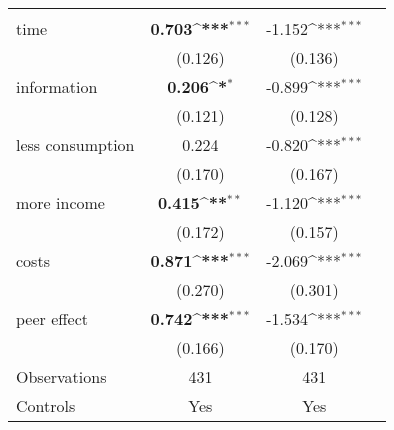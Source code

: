 \documentclass[pdflatex]{beamer}
\def\sym#1{\ifmmode^{#1}\else\(^{#1}\)\fi}
\begin{document}
\begin{frame}
\begin{table}[]
{\begin{tabular}{l*{3}{c}}
				\hline
				&                     &                     \\
				time                &       \textbf{0.703\sym{***}}&      -1.152\sym{***}\\
				&     (0.126)         &     (0.136)         \\
				[1em]
				information         &       \textbf{0.206\sym{*}}  &      -0.899\sym{***}\\
				&     (0.121)         &     (0.128)         \\
				[1em]
				less consumption    &       0.224         &      -0.820\sym{***}\\
				&     (0.170)         &     (0.167)         \\
				[1em]
				more income         &       \textbf{0.415\sym{**}} &      -1.120\sym{***}\\
				&     (0.172)         &     (0.157)         \\
				[1em]
				costs               &       \textbf{0.871\sym{***}}&      -2.069\sym{***}\\
				&     (0.270)         &     (0.301)         \\
				[1em]
				peer effect         &       \textbf{0.742\sym{***}}&      -1.534\sym{***}\\
				&     (0.166)         &     (0.170)         \\
				\hline
				Observations        &         431         &         431         \\
				Controls            &         Yes         &         Yes         \\
				\hline\hline
			\end{tabular}
			
		}
	\end{table}
	
\end{frame}
\end{document}

